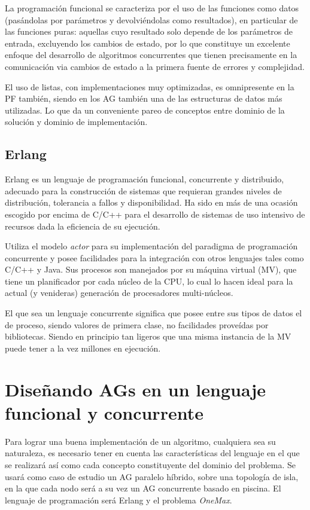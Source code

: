 \documentclass[runningheads]{llncs}
\begin{document}
La programación funcional se caracteriza por el uso de las funciones como datos (pasándolas por parámetros y devolviéndolas como resultados), en particular de las funciones puras: aquellas cuyo resultado solo depende de los parámetros de entrada, excluyendo los cambios de estado, por lo que constituye un excelente enfoque del desarrollo de algoritmos concurrentes que tienen precisamente en la comunicación via cambios de estado a la primera fuente de errores y complejidad.

El uso de listas, con implementaciones muy optimizadas, es omnipresente en la PF también, siendo en los AG también una de las estructuras de datos más utilizadas. Lo que da un conveniente pareo de conceptos entre dominio de la solución y dominio de implementación.

\subsection{Erlang}


Erlang es un lenguaje de programación funcional, concurrente y distribuido, adecuado para la construcción de sistemas que requieran grandes niveles de distribución, tolerancia a fallos y disponibilidad. Ha sido en más de una ocasión escogido por encima de C/C++ para el desarrollo de sistemas de uso intensivo de recursos \cite{Cesarini2009} dada la eficiencia de su ejecución.

Utiliza el modelo {\em actor} para su implementación del paradigma de programación concurrente y posee facilidades para la integración con otros lenguajes tales como C/C++ y Java. Sus procesos son manejados por su máquina virtual (MV), que tiene un planificador por cada núcleo de la CPU, lo cual lo hacen ideal para la actual (y venideras) generación de procesadores multi-núcleos.

El que sea un lenguaje concurrente significa que posee entre sus tipos de datos el de proceso, siendo valores de primera clase, no facilidades proveídas por bibliotecas. Siendo en principio tan ligeros que una misma instancia de la MV puede tener a la vez millones en ejecución.

\section{Diseñando AGs en un lenguaje funcional y concurrente}
\label{sec:design}

Para lograr una buena implementación de un algoritmo, cualquiera sea su naturaleza, es necesario tener en cuenta las características del lenguaje en el que se realizará así como cada concepto constituyente del dominio del problema. Se usará como caso de estudio un AG paralelo híbrido, sobre una topología de isla, en la que cada nodo será a su vez un AG concurrente basado en piscina. El lenguaje de programación será Erlang y el problema {\em OneMax}.
\end{document}
